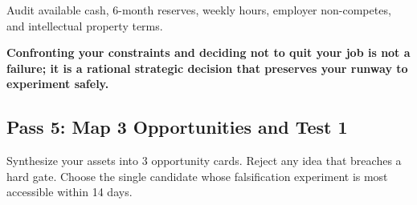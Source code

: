Audit available cash, 6-month reserves, weekly hours, employer non-competes, and intellectual property terms.

\textbf{Confronting your constraints and deciding not to quit your job is not a failure; it is a rational strategic decision that preserves your runway to experiment safely.}

\subsection{Pass 5: Map 3 Opportunities and Test 1}

Synthesize your assets into 3 opportunity cards. Reject any idea that breaches a hard gate. Choose the single candidate whose falsification experiment is most accessible within 14 days.

